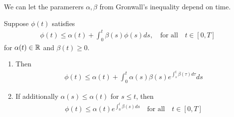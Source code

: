 We can let the paramerers $\alpha, \beta$ from Gronwall's inequality depend on time.
\begin{thm}
  Suppose $\phi(t)$ satisfies
  \begin{align*}
    \phi(t) \leq \alpha(t) + \int_{0}^{t}\beta(s) \phi(s) ds, \quad \text{for all} \quad t \in [0,T]
  \end{align*}
  for $\alpha(t) \in \mathbb{R}$ and $\beta(t) \geq 0$.

  \begin{enumerate}
    \item Then
      \begin{align*}
        \phi(t) \leq \alpha(t) + \int_{0}^{t}\alpha(s) \beta(s) e^{\int_{s}^{t}\beta(\tau)d \tau}ds
      \end{align*}
    \item If additionally $\alpha(s) \leq \alpha(t)$ for $s \leq t$, then
      \begin{align*}
        \phi(t) \leq \alpha(t) e^{\int_{0}^{t}\beta(s)ds} \quad \text{for all} \quad t \in [0,T]
      \end{align*}
  \end{enumerate}
\end{thm}





